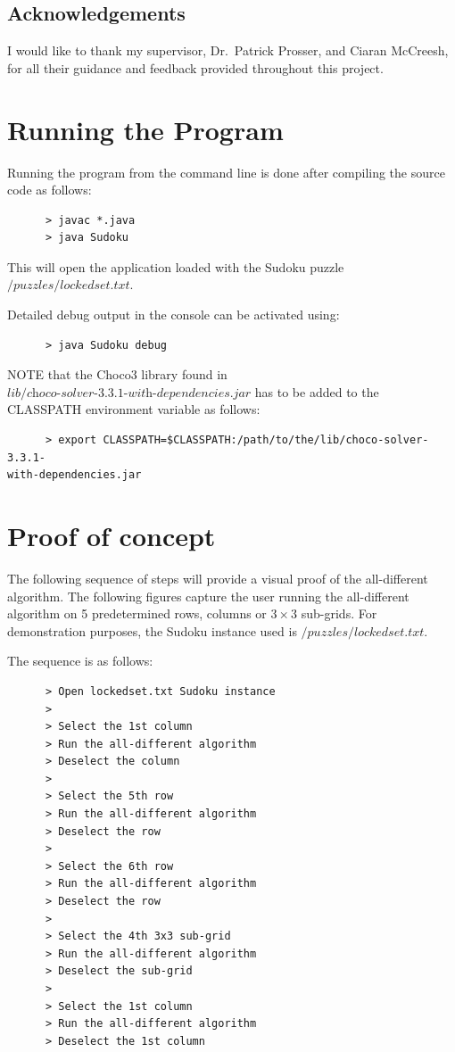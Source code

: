 \documentclass{l4proj}
\begin{document}
\section{Acknowledgements}
\noindent I would like to thank my supervisor, Dr.~Patrick Prosser, and Ciaran McCreesh, for all their guidance and feedback provided throughout this project.

\begin{appendices}
\chapter{Running the Program}
Running the program from the command line is done after compiling the source code as follows:
\begin{verbatim}
      > javac *.java
      > java Sudoku
\end{verbatim}
This will open the application loaded with the Sudoku puzzle $\textit{/puzzles/lockedset.txt}$.

\noindent Detailed debug output in the console can be activated using:
\begin{verbatim}
      > java Sudoku debug
\end{verbatim}

\noindent NOTE that the Choco3 library \cite{choco} found in $\textit{lib/choco-solver-3.3.1-with-dependencies.jar}$ has to be added to the CLASSPATH environment variable as follows:

\begin{verbatim}
      > export CLASSPATH=$CLASSPATH:/path/to/the/lib/choco-solver-3.3.1-
with-dependencies.jar
\end{verbatim}


\chapter{Proof of concept}
\label{chapterpoc} 
The following sequence of steps will provide a visual proof of the all-different algorithm. The following figures capture the user running the all-different algorithm on 5 predetermined rows, columns or $3\times 3$ sub-grids. For demonstration purposes, the Sudoku instance used is $/puzzles/lockedset.txt$.

\noindent The sequence is as follows:
\begin{verbatim}
      > Open lockedset.txt Sudoku instance
      >
      > Select the 1st column
      > Run the all-different algorithm
      > Deselect the column
      >
      > Select the 5th row
      > Run the all-different algorithm
      > Deselect the row
      >
      > Select the 6th row
      > Run the all-different algorithm
      > Deselect the row
      >
      > Select the 4th 3x3 sub-grid
      > Run the all-different algorithm
      > Deselect the sub-grid
      >
      > Select the 1st column
      > Run the all-different algorithm
      > Deselect the 1st column
\end{verbatim}


\end{appendices}
\end{document}
